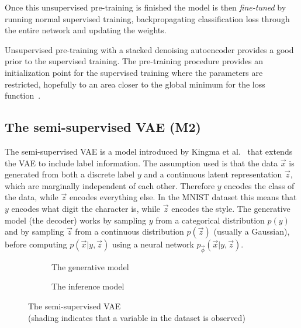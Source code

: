 Once this unsupervised pre-training is finished the model is then \textit{fine-tuned} by running normal supervised training, backpropagating
classification loss through the entire network and updating the weights.

Unsupervised pre-training with a stacked denoising autoencoder provides a good prior to the supervised training.
The pre-training procedure provides an initialization point for the supervised training where the parameters are restricted, hopefully to an area 
closer to the global minimum for the loss function~\cite{Erhan:2010:WUP:1756006.1756025}.

\subsection{The semi-supervised VAE (M2)} \label{ssVAE}

The semi-supervised VAE is a model introduced by Kingma et al.~\cite{DBLP:journals/corr/KingmaRMW14} that extends the VAE to include label information. 
The assumption used is that the data $\vec{x}$ is generated from both a discrete label $y$ and a continuous latent representation 
$\vec{z}$, which are marginally independent of each other.
Therefore $y$ encodes the class of the data, while $\vec{z}$ encodes everything else. In the MNIST dataset this means that $y$ encodes
what digit the character is, while $\vec{z}$ encodes the style. The generative model (the decoder) works by sampling $y$ from a 
categorical distribution $p(y)$ and by sampling $\vec{z}$ from a continuous distribution $p(\vec{z})$ (usually a Gaussian), before computing 
$p(\vec{x}|y, \vec{z})$ using a neural network $p_{\vec{\phi}}(\vec{x}|y, \vec{z})$.
\begin{figure}[H]
  \begin{subfigure}[b]{0.5\textwidth}
    \centering
    \scalebox{.9}{}
    \caption{The generative model}
  \end{subfigure}
  \begin{subfigure}[b]{0.5\textwidth}
    \centering
    \scalebox{.9}{}
    \caption{The inference model}
  \end{subfigure}
  \caption[Semi-supervised VAE]{The semi-supervised VAE \\ (shading indicates that a variable in the dataset is observed)}
  \label{fig:ss_vae}
\end{figure}

